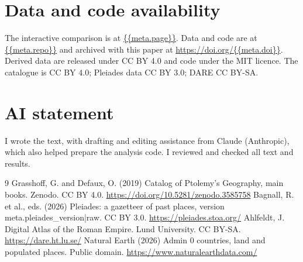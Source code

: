 \documentclass[11pt,a4paper]{article}
\begin{document}
\section*{Data and code availability}
The interactive comparison is at \url{{{meta.page}}}. Data and code are at \url{{{meta.repo}}} and archived with this paper at \url{https://doi.org/{{meta.doi}}}. Derived data are released under CC BY 4.0 and code under the MIT licence. The catalogue is CC BY 4.0; Pleiades data CC BY 3.0; DARE CC BY-SA.

\section*{AI statement}
I wrote the text, with drafting and editing assistance from Claude (Anthropic), which also helped prepare the analysis code. I reviewed and checked all text and results.

\begin{thebibliography}{9}
 Grasshoff, G. and Defaux, O. (2019) Catalog of Ptolemy's Geography, main books. Zenodo. CC BY 4.0. \url{https://doi.org/10.5281/zenodo.3585758}
 Bagnall, R. et al., eds. (2026) Pleiades: a gazetteer of past places, version {{meta.pleiades_version|raw}}. CC BY 3.0. \url{https://pleiades.stoa.org/}
 Ahlfeldt, J. Digital Atlas of the Roman Empire. Lund University. CC BY-SA. \url{https://dare.ht.lu.se/}
 Natural Earth (2026) Admin 0 countries, land and populated places. Public domain. \url{https://www.naturalearthdata.com/}
\end{thebibliography}
\end{document}
